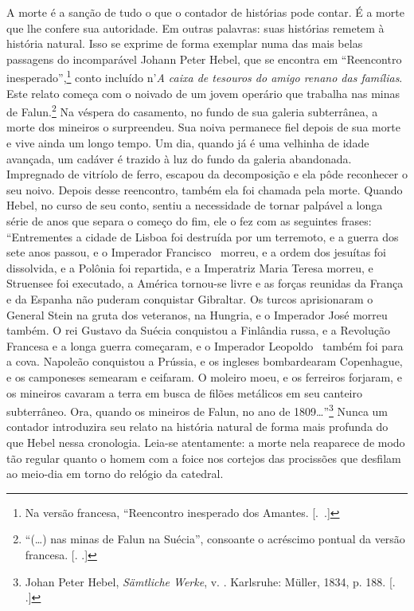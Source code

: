 A morte é a sanção de tudo o que o contador de histórias pode contar. É
a morte que lhe confere sua autoridade. Em outras palavras: suas
histórias remetem à história natural. Isso se exprime de forma exemplar
numa das mais belas passagens do incomparável Johann Peter Hebel, que se
encontra em ``Reencontro inesperado'',\footnote{Na versão francesa,
  ``Reencontro inesperado dos Amantes. [.~.]} conto
incluído n'\emph{A caixa de tesouros do amigo renano das famílias}. Este
relato começa com o noivado de um jovem operário que trabalha nas minas
de Falun.\footnote{``(\ldots{}) nas minas de Falun na Suécia'', consoante o
  acréscimo pontual da versão francesa. [. .]} Na véspera do
casamento, no fundo de sua galeria subterrânea, a morte dos mineiros o
surpreendeu. Sua noiva permanece fiel depois de sua morte e vive ainda
um longo tempo. Um dia, quando já é uma velhinha de idade avançada, um
cadáver é trazido à luz do fundo da galeria abandonada. Impregnado de
vitríolo de ferro, escapou da decomposição e ela pôde reconhecer o seu
noivo. Depois desse reencontro, também ela foi chamada pela morte.
Quando Hebel, no curso de seu conto, sentiu a necessidade de tornar
palpável a longa série de anos que separa o começo do fim, ele o fez com
as seguintes frases: ``Entrementes a cidade de Lisboa foi destruída por
um terremoto, e a guerra dos sete anos passou, e o Imperador Francisco~
morreu, e a ordem dos jesuítas foi dissolvida, e a Polônia foi
repartida, e a Imperatriz Maria Teresa morreu, e Struensee foi
executado, a América tornou-se livre e as forças reunidas da França e da
Espanha não puderam conquistar Gibraltar. Os turcos aprisionaram o
General Stein na gruta dos veteranos, na Hungria, e o Imperador José
morreu também. O rei Gustavo da Suécia conquistou a Finlândia russa, e a
Revolução Francesa e a longa guerra começaram, e o Imperador Leopoldo~
também foi para a cova. Napoleão conquistou a Prússia, e os ingleses
bombardearam Copenhague, e os camponeses semearam e ceifaram. O moleiro
moeu, e os ferreiros forjaram, e os mineiros cavaram a terra em busca de
filões metálicos em seu canteiro subterrâneo. Ora, quando os mineiros de
Falun, no ano de 1809\ldots{}''\footnote{Johan Peter Hebel, \emph{Sämtliche
  Werke}, v. . Karlsruhe: Müller, 1834, p. 188. [. .]}
Nunca um contador introduzira seu relato na história natural de forma
mais profunda do que Hebel nessa cronologia. Leia-se atentamente: a
morte nela reaparece de modo tão regular quanto o homem com a foice nos
cortejos das procissões que desfilam ao meio-dia em torno do relógio da
catedral.

